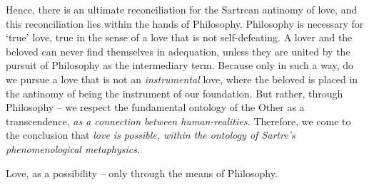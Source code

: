 Hence, there is an ultimate reconciliation for the Sartrean antinomy of love, and this reconciliation lies within the hands of Philosophy. Philosophy is necessary for \enquote*{true} love, true in the sense of a love that is not self-defeating. A lover and the beloved can never find themselves in adequation, unless they are united by the pursuit of Philosophy as the intermediary term. Because only in such a way, do we pursue a love that is not an \emph{instrumental} love, where the beloved is placed in the antinomy of being the instrument of our foundation. But rather, through Philosophy -- we respect the fundamental ontology of the Other as a transcendence, \emph{as a connection between human-realities.}  Therefore, we come to the conclusion that \emph{love is possible, within the ontology of Sartre's phenomenological metaphysics.} 

\noindent
Love, as a possibility -- only through the means of Philosophy.
